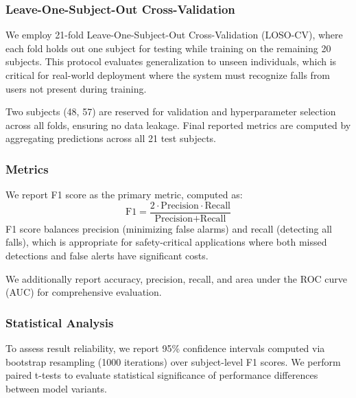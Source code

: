 \subsubsection{Leave-One-Subject-Out Cross-Validation}
We employ 21-fold Leave-One-Subject-Out Cross-Validation (LOSO-CV), where each fold holds out one subject for testing while training on the remaining 20 subjects. This protocol evaluates generalization to unseen individuals, which is critical for real-world deployment where the system must recognize falls from users not present during training.

Two subjects (48, 57) are reserved for validation and hyperparameter selection across all folds, ensuring no data leakage. Final reported metrics are computed by aggregating predictions across all 21 test subjects.

\subsubsection{Metrics}
We report F1 score as the primary metric, computed as:
\begin{equation}
\text{F1} = \frac{2 \cdot \text{Precision} \cdot \text{Recall}}{\text{Precision} + \text{Recall}}
\end{equation}
F1 score balances precision (minimizing false alarms) and recall (detecting all falls), which is appropriate for safety-critical applications where both missed detections and false alerts have significant costs.

We additionally report accuracy, precision, recall, and area under the ROC curve (AUC) for comprehensive evaluation.

\subsubsection{Statistical Analysis}
To assess result reliability, we report 95\% confidence intervals computed via bootstrap resampling (1000 iterations) over subject-level F1 scores. We perform paired t-tests to evaluate statistical significance of performance differences between model variants.
